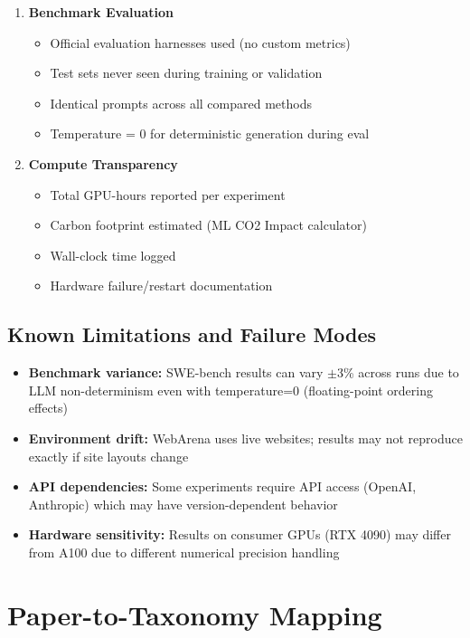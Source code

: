 \documentclass[12pt,a4paper]{report}
\theoremstyle{definition}
\begin{document}
\begin{enumerate}[leftmargin=*]
    \item \textbf{Benchmark Evaluation}
    \begin{itemize}[nosep]
        \item[$\square$] Official evaluation harnesses used (no custom metrics)
        \item[$\square$] Test sets never seen during training or validation
        \item[$\square$] Identical prompts across all compared methods
        \item[$\square$] Temperature = 0 for deterministic generation during eval
    \end{itemize}

    \item \textbf{Compute Transparency}
    \begin{itemize}[nosep]
        \item[$\square$] Total GPU-hours reported per experiment
        \item[$\square$] Carbon footprint estimated (ML CO2 Impact calculator)
        \item[$\square$] Wall-clock time logged
        \item[$\square$] Hardware failure/restart documentation
    \end{itemize}
\end{enumerate}

\section*{Known Limitations and Failure Modes}

\begin{itemize}
    \item \textbf{Benchmark variance:} SWE-bench results can vary $\pm$3\% across runs due to LLM non-determinism even with temperature=0 (floating-point ordering effects)
    \item \textbf{Environment drift:} WebArena uses live websites; results may not reproduce exactly if site layouts change
    \item \textbf{API dependencies:} Some experiments require API access (OpenAI, Anthropic) which may have version-dependent behavior
    \item \textbf{Hardware sensitivity:} Results on consumer GPUs (RTX 4090) may differ from A100 due to different numerical precision handling
\end{itemize}

\chapter{Paper-to-Taxonomy Mapping}
\label{app:paper_mapping}
\end{document}
